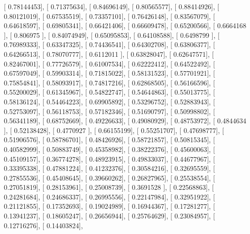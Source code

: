 \documentclass{article}
\begin{document}
       [ 0.78144453],
       [ 0.71375634],
       [ 0.84696149],
       [ 0.80565577],
       [ 0.88414926],
       [ 0.80121019],
       [ 0.67535519],
       [ 0.73357101],
       [ 0.76426148],
       [ 0.83567079],
       [ 0.64618597],
       [ 0.69805341],
       [ 0.66421406],
       [ 0.66609478],
       [ 0.65200566],
       [ 0.6664168 ],
       [ 0.806975  ],
       [ 0.84074949],
       [ 0.65095853],
       [ 0.64108588],
       [ 0.6498799 ],
       [ 0.76989333],
       [ 0.63347325],
       [ 0.74436541],
       [ 0.64302708],
       [ 0.63806377],
       [ 0.64266513],
       [ 0.78070777],
       [ 0.6112011 ],
       [ 0.63828047],
       [ 0.62647571],
       [ 0.82467001],
       [ 0.77726579],
       [ 0.61007534],
       [ 0.62222412],
       [ 0.64522492],
       [ 0.67597049],
       [ 0.59903314],
       [ 0.71815022],
       [ 0.58131523],
       [ 0.57701921],
       [ 0.75854841],
       [ 0.58093917],
       [ 0.74817216],
       [ 0.62868505],
       [ 0.56166596],
       [ 0.55200029],
       [ 0.61345967],
       [ 0.54822747],
       [ 0.54644863],
       [ 0.55013775],
       [ 0.58136124],
       [ 0.54464223],
       [ 0.69905892],
       [ 0.53296752],
       [ 0.52883943],
       [ 0.52753097],
       [ 0.56118753],
       [ 0.57182346],
       [ 0.51690797],
       [ 0.50998802],
       [ 0.56341189],
       [ 0.68752669],
       [ 0.49226633],
       [ 0.49080929],
       [ 0.48753972],
       [ 0.4844634 ],
       [ 0.52138428],
       [ 0.4770927 ],
       [ 0.66155199],
       [ 0.55251707],
       [ 0.47698777],
       [ 0.51906576],
       [ 0.58786701],
       [ 0.48426926],
       [ 0.58721857],
       [ 0.50815345],
       [ 0.40582999],
       [ 0.50883749],
       [ 0.45358982],
       [ 0.38222376],
       [ 0.45600063],
       [ 0.45109157],
       [ 0.36774278],
       [ 0.48923915],
       [ 0.49833037],
       [ 0.44677967],
       [ 0.33395338],
       [ 0.47881224],
       [ 0.41232376],
       [ 0.30584216],
       [ 0.32695559],
       [ 0.27855536],
       [ 0.45408645],
       [ 0.39660262],
       [ 0.26827965],
       [ 0.25538554],
       [ 0.27051819],
       [ 0.28153961],
       [ 0.25008739],
       [ 0.3691528 ],
       [ 0.22568863],
       [ 0.24281684],
       [ 0.24686337],
       [ 0.26995556],
       [ 0.22147984],
       [ 0.32951922],
       [ 0.21121855],
       [ 0.17352693],
       [ 0.19024989],
       [ 0.16944367],
       [ 0.17281277],
       [ 0.13941237],
       [ 0.18605247],
       [ 0.26656944],
       [ 0.25764629],
       [ 0.23084957],
       [ 0.12716276],
       [ 0.14403824],
\end{document}
